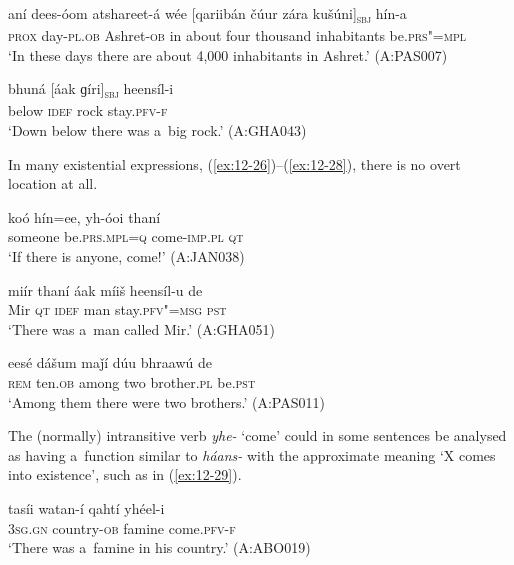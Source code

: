\begin{exe}
\ex
\label{ex:12-24}
\gll aní dees-óom atshareet-á wée [qariibán čúur zára kušúni]\textsubscript{\textsc{sbj}} hín-a \\
\textsc{prox} day-\textsc{pl.ob} Ashret-\textsc{ob} in about  four thousand inhabitants be.\textsc{prs"=mpl}\\
\glt `In these days there are about 4,000 inhabitants in Ashret.' (A:PAS007)

\ex
\label{ex:12-25}
\gll bhuná [áak ɡíri]\textsubscript{\textsc{sbj}} heensíl-i \\
below \textsc{idef} rock stay.\textsc{pfv-f} \\
\glt `Down below there was a~big rock.' (A:GHA043)
\end{exe}

In many existential expressions, (\ref{ex:12-26})--(\ref{ex:12-28}), there is no overt location at all.

\begin{exe}
\ex
\label{ex:12-26}
\gll koó hín=ee, yh-óoi thaní \\
someone be.\textsc{prs.mpl}=\textsc{q} come-\textsc{imp.pl} \textsc{qt} \\
\glt `If there is anyone, come!' (A:JAN038)
\end{exe}
\begin{exe}
\ex
\label{ex:12-27}
\gll miír thaní áak míiš heensíl-u de \\
Mir \textsc{qt} \textsc{idef} man stay.\textsc{pfv"=msg} \textsc{pst} \\
\glt `There was a~man called Mir.' (A:GHA051)
\end{exe}
\begin{exe}
\ex
\label{ex:12-28}
\gll eesé dášum maǰí dúu bhraawú de \\
\textsc{rem} ten.\textsc{ob} among two brother.\textsc{pl} be.\textsc{pst} \\
\glt `Among them there were two brothers.' (A:PAS011)
\end{exe}

The (normally) intransitive verb \textit{yhe-} `come' could in some sentences be analysed as having a~function similar to \textit{háans-} with the approximate meaning `X comes into existence', such as in (\ref{ex:12-29}).

\begin{exe}
\ex
\label{ex:12-29}
\gll tasíi watan-í qahtí yhéel-i \\
\textsc{3sg.gn} country-\textsc{ob} famine come.\textsc{pfv-f} \\
\glt `There was a~famine in his country.' (A:ABO019)
\end{exe}

